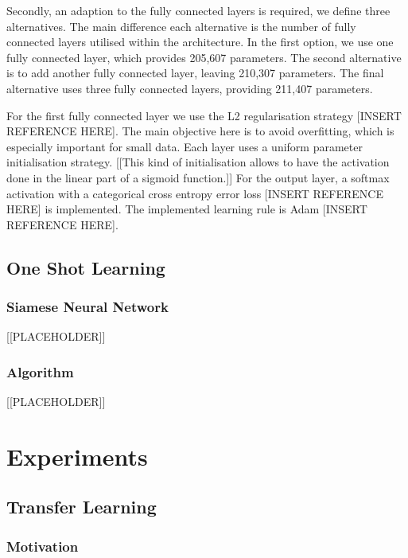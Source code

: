 \documentclass{article}
\begin{document}
Secondly, an adaption to the fully connected layers is required, we define three alternatives. The main difference each alternative is the number of fully connected layers utilised within the architecture. In the first option, we use one fully connected layer, which provides 205,607 parameters. The second alternative is to add another fully connected layer, leaving 210,307 parameters. The final alternative uses three fully connected layers, providing 211,407 parameters.

For the first fully connected layer we use the L2 regularisation strategy [INSERT REFERENCE HERE]. The main objective here is to avoid overfitting, which is especially important for small data. Each layer uses a uniform parameter initialisation strategy. [[This kind of initialisation allows to have the activation done in the linear part of a sigmoid function.]] For the output layer, a softmax activation with a categorical cross entropy error loss [INSERT REFERENCE HERE] is implemented. The implemented learning rule is Adam [INSERT REFERENCE HERE].

\subsection{One Shot Learning}
\label{sec:oneshot}

\subsubsection{\textbf{Siamese Neural Network}}

[[PLACEHOLDER]]

\subsubsection{\textbf{Algorithm}}

[[PLACEHOLDER]]

\section{Experiments}
\label{sec:experiments}

\subsection{Transfer Learning}

\subsubsection{\textbf{Motivation}}
\end{document}
